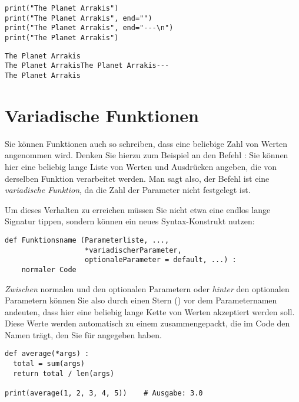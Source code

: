 \begin{codebox}
\begin{verbatim}
print("The Planet Arrakis")
print("The Planet Arrakis", end="")
print("The Planet Arrakis", end="---\n")
print("The Planet Arrakis")
\end{verbatim}
\end{codebox}
\begin{cmdbox}
\begin{verbatim}
The Planet Arrakis
The Planet ArrakisThe Planet Arrakis---
The Planet Arrakis
\end{verbatim}
\end{cmdbox}

\section{Variadische Funktionen}
Sie können Funktionen auch so schreiben, dass eine beliebige Zahl von Werten angenommen wird. Denken Sie hierzu zum Beispiel an den Befehl : Sie können hier eine beliebig lange Liste von Werten und Ausdrücken angeben, die von derselben Funktion verarbeitet werden. Man sagt also, der Befehl  ist eine \emph{variadische Funktion}, da die Zahl der Parameter nicht festgelegt ist.

Um dieses Verhalten zu erreichen müssen Sie nicht etwa eine endlos lange Signatur tippen, sondern können ein neues Syntax-Konstrukt nutzen:

\begin{codebox}
\begin{verbatim}
def Funktionsname (Parameterliste, ...,
                   *variadischerParameter,
                   optionaleParameter = default, ...) :
    normaler Code
\end{verbatim}
\end{codebox}

\emph{Zwischen} normalen und den optionalen Parametern oder \emph{hinter} den optionalen Parametern können Sie also durch einen Stern (\inPy{*}) vor dem Parameternamen andeuten, dass hier eine beliebig lange Kette von Werten akzeptiert werden soll. Diese Werte werden automatisch zu einem  zusammengepackt, die im Code den Namen trägt, den Sie für  angegeben haben.

\begin{codebox}
\begin{verbatim}
def average(*args) :
  total = sum(args)
  return total / len(args)

print(average(1, 2, 3, 4, 5))    # Ausgabe: 3.0
\end{verbatim}
\end{codebox}

